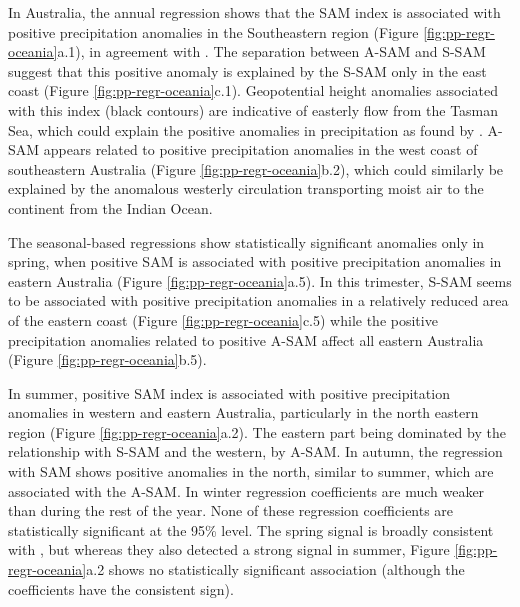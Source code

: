 \documentclass[smallextended]{svjour3}       %
\begin{document}
In Australia, the annual regression shows that the SAM index is associated with positive precipitation anomalies in the Southeastern region (Figure \ref{fig:pp-regr-oceania}a.1), in agreement with \citet{gillett2006}.
The separation between A\nobreakdash-SAM and S\nobreakdash-SAM suggest that this positive anomaly is explained by the S\nobreakdash-SAM only in the east coast (Figure \ref{fig:pp-regr-oceania}c.1).
Geopotential height anomalies associated with this index (black contours) are indicative of easterly flow from the Tasman Sea, which could explain the positive anomalies in precipitation as found by \citet{hendon2007}.
A\nobreakdash-SAM appears related to positive precipitation anomalies in the west coast of southeastern Australia (Figure \ref{fig:pp-regr-oceania}b.2), which could similarly be explained by the anomalous westerly circulation transporting moist air to the continent from the Indian Ocean.

The seasonal-based regressions show statistically significant anomalies only in spring, when positive SAM is associated with positive precipitation anomalies in eastern Australia (Figure \ref{fig:pp-regr-oceania}a.5).
In this trimester, S\nobreakdash-SAM seems to be associated with positive precipitation anomalies in a relatively reduced area of the eastern coast (Figure \ref{fig:pp-regr-oceania}c.5) while the positive precipitation anomalies related to positive A\nobreakdash-SAM affect all eastern Australia (Figure \ref{fig:pp-regr-oceania}b.5).

In summer, positive SAM index is associated with positive precipitation anomalies in western and eastern Australia, particularly in the north eastern region (Figure \ref{fig:pp-regr-oceania}a.2).
The eastern part being dominated by the relationship with S\nobreakdash-SAM and the western, by A\nobreakdash-SAM.
In autumn, the regression with SAM shows positive anomalies in the north, similar to summer, which are associated with the A\nobreakdash-SAM.
In winter regression coefficients are much weaker than during the rest of the year.
None of these regression coefficients are statistically significant at the 95\% level.
The spring signal is broadly consistent with \citet{hendon2007}, but whereas they also detected a strong signal in summer, Figure \ref{fig:pp-regr-oceania}a.2 shows no statistically significant association (although the coefficients have the consistent sign).
\end{document}

